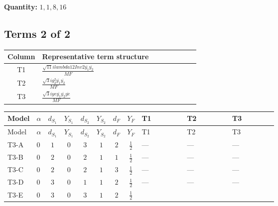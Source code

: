 \documentclass[8pt]{article}
\begin{document}
\begin{landscape}
\begin{longtable}{@{}llcccccc >{\raggedright\arraybackslash}p{0.21\linewidth} >{\raggedright\arraybackslash}p{0.21\linewidth} >{\raggedright\arraybackslash}p{0.21\linewidth}@{}}
\midrule
\bottomrule
\end{longtable}
\clearpage
\noindent\textbf{Quantity: }$\mathrm{1,1,8,16}$\par\smallskip
\subsection*{Terms 2 of 2}
\begin{center}
\begin{tabular}{@{}c >{\raggedright\arraybackslash}p{0.82\linewidth}@{}}
\toprule
Column & Representative term structure \\
\midrule
T1 & \(\displaystyle \frac{\sqrt{11} i lambda12Inv2 \overline{y_{1}} \overline{y_{2}}}{MF}\) \\
\midrule
T2 & \(\displaystyle \frac{\sqrt{3} i g_{2}^{2} \overline{y_{1}} \overline{y_{2}}}{MF}\) \\
\midrule
T3 & \(\displaystyle \frac{\sqrt{3} i ye \overline{y_{1}} \overline{y_{2}} \overline{ye}}{MF}\) \\
\midrule
\bottomrule
\end{tabular}
\end{center}
\smallskip
\tiny
\begin{longtable}{@{}llcccccc >{\raggedright\arraybackslash}p{0.21\linewidth} >{\raggedright\arraybackslash}p{0.21\linewidth} >{\raggedright\arraybackslash}p{0.21\linewidth}@{}}
\toprule
Model & $\alpha$ & $d_{S_1}$ & $Y_{S_1}$ & $d_{S_2}$ & $Y_{S_2}$ & $d_F$ & $Y_F$ & T1 & T2 & T3 \\
\midrule
\endfirsthead
\toprule
Model & $\alpha$ & $d_{S_1}$ & $Y_{S_1}$ & $d_{S_2}$ & $Y_{S_2}$ & $d_F$ & $Y_F$ & T1 & T2 & T3 \\
\midrule
\endhead
T3-A & $0$ & $1$ & $0$ & $3$ & $1$ & $2$ & $\frac{1}{2}$ & --- & --- & --- \\
\midrule
T3-B & $0$ & $2$ & $0$ & $2$ & $1$ & $1$ & $\frac{1}{2}$ & --- & --- & --- \\
\midrule
T3-C & $0$ & $2$ & $0$ & $2$ & $1$ & $3$ & $\frac{1}{2}$ & --- & --- & --- \\
\midrule
T3-D & $0$ & $3$ & $0$ & $1$ & $1$ & $2$ & $\frac{1}{2}$ & --- & --- & --- \\
\midrule
T3-E & $0$ & $3$ & $0$ & $3$ & $1$ & $2$ & $\frac{1}{2}$ & \scriptsize\adjustbox{max width=\linewidth}{$\begin{gathered} \frac{3 \sqrt{11} i lambda12Inv2 \overline{y_{1}} \overline{y_{2}}}{22 MF}\end{gathered}$} & \scriptsize\adjustbox{max width=\linewidth}{$\begin{gathered} \frac{11 \sqrt{3} i g_{2}^{2} \overline{y_{1}} \overline{y_{2}}}{8 MF}\end{gathered}$} & \scriptsize\adjustbox{max width=\linewidth}{$\begin{gathered} - \frac{\sqrt{3} i ye \overline{y_{1}} \overline{y_{2}} \overline{ye}}{12 MF}\end{gathered}$} \\
\midrule
\bottomrule
\end{longtable}
\clearpage

\end{landscape}
\end{document}

